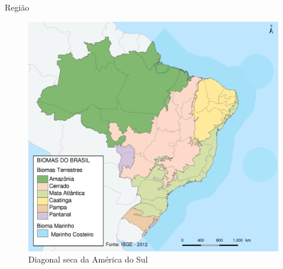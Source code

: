 \documentclass{beamer}
\begin{document}
    \begin{frame}{Região}
      \begin{figure}[!h]
          \centering
          \includegraphics[scale=0.1]{regiao2.png}
  	      \caption{Diagonal seca da América do Sul}
          \label{Rotulo}
      \end{figure}
    \end{frame}    
 
\end{document}

